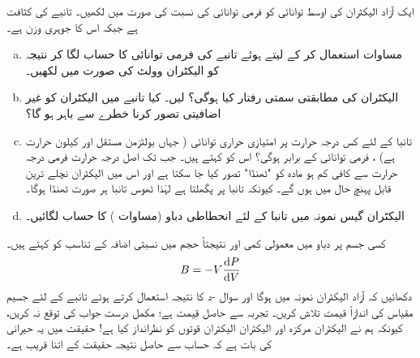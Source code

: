 ایک آزاد الیکٹران کی اوسط توانائی  کو فرمی توانائی کی نسبت  کی  صورت میں  لکھیں۔
  
تانبے  کی کثافت  ہے جبکہ اس کا جوہری وزن  ہے۔
\begin{enumerate}[a.]
\item
 مساوات      استعمال کر کے   لیتے ہوئے تانبے کی فرمی توانائی کا حساب لگا کر نتیجہ کو الیکٹران وولٹ کی صورت میں لکھیں۔
\item
 الیکٹران کی مطابقتی سمتی رفتار کیا ہوگی؟   لیں۔ کیا تانبے   میں الیکٹران کو غیر اضافیتی تصور کرنا   خطرے  سے باہر ہو گا؟
\item
 تانبا کے لئے کس درجہ حرارت پر امتیازی حراری توانائی (  جہاں  بولٹزمن مستقل اور  کیلون حرارت ہے) ،  فرمی توانائی کے برابر ہوگی؟  اس کو کہتے ہیں۔ جب تک   اصل  درجہ  حرارت فرمی درجہ  حرارت سے کافی کم ہو مادہ کو "ٹھنڈا" تصور کیا جا سکتا ہے اور اس میں الیکٹران نچلے ترین قابل پہنچ حال میں ہوں گے۔ کیونکہ تانبا   پر پگھلتا  ہے لہٰذا ٹھوس تانبا ہر صورت ٹھنڈا ہوگا۔
\item 
 الیکٹران گیس نمونہ میں تانبا کے لئے انحطاطی دباو (مساوات )   کا حساب لگائیں۔
 \end{enumerate}
کسی جسم پر دباو میں معمولی کمی اور نتیجتاً حجم میں نسبتی اضافہ کے تناسب کو   کہتے ہیں۔
\begin{align*}
	B = -V\frac{\dif P}{\dif V}
\end{align*}
دکھائیں کہ آزاد الیکٹران نمونہ میں ہوگا اور سوال  -د   کا نتیجہ استعمال کرتے ہوئے تانبے کے لئے جسیم مقیاس کی اندازاً قیمت تلاش کریں۔  تجربہ سے حاصل قیمت  ہے؛  مکمل درست جواب کی توقع نہ کریں، کیونکہ ہم نے الیکٹران مرکزہ اور الیکٹران الیکٹران قوتوں کو نظرانداز کیا ہے! حقیقت میں یہ حیرانی کی بات ہے کہ حساب سے حاصل نتیجہ حقیقت کے اتنا قریب ہے۔ 

